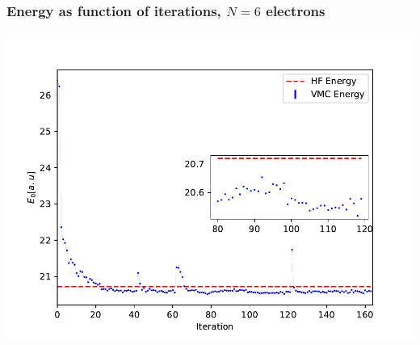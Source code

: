 \documentclass{beamer}
\begin{document}
\begin{frame}
\frametitle{Energy as function of iterations, $N=6$ electrons}

\begin{block}{}


\vspace{6mm}

\centerline{\includegraphics[width=0.9\linewidth]{figures/figN6.pdf}}

\vspace{6mm}


\end{block}
\end{frame}
\end{document}
